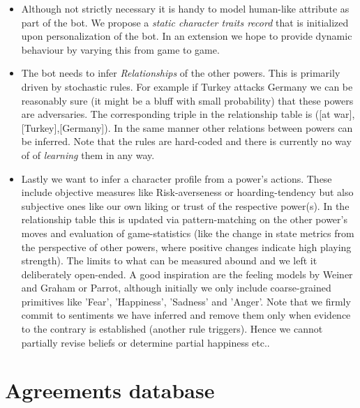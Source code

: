 \documentclass[pdftex,11pt,a4paper]{report}
\begin{document}
\begin{itemize}

\item Although not strictly necessary it is handy to model
      human-like attribute as part of the bot. We propose a
      \textit{static character traits record} that is 
      initialized upon personalization of the bot. In an 
      extension we hope to provide dynamic behaviour by
      varying this from game to game.

\item The bot needs to infer \textit{Relationships} of the
      other powers. This is primarily driven by stochastic rules.
      For example if Turkey attacks Germany we can be reasonably 
      sure (it might be a bluff with small probability) that these
      powers are adversaries. The corresponding triple in the
      relationship table is ([at war],[Turkey],[Germany]). In the  
      same manner other relations between powers can be inferred. 
      Note that the rules are hard-coded and there is currently
      no way of of \textit{learning} them in any way.

\item Lastly we want to infer a character profile from a power's actions.
      These include objective measures like Risk-averseness or 
      hoarding-tendency but also subjective ones like our own 
      liking or trust of the respective power(s). In the relationship table this
      is updated via pattern-matching on the other power's moves and
      evaluation of game-statistics (like the change in 
      state metrics from the perspective of other powers, where positive
      changes indicate high playing strength). The limits to what can
      be measured abound and we left it deliberately open-ended. A good
      inspiration are the feeling models by Weiner and Graham or 
      Parrot, although initially we only include coarse-grained primitives
      like  'Fear', 'Happiness', 'Sadness' and 'Anger'. Note that
      we firmly commit to sentiments we have inferred and remove them only 
      when evidence to the contrary is established (another rule triggers).
      Hence we cannot partially revise beliefs or determine partial happiness etc..

\end{itemize}

\section{Agreements database}
\end{document}
